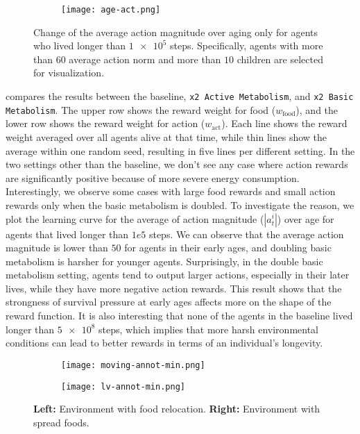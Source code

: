 \begin{figure}[t]
  \begin{subfigure}[t]{7cm}
    \centering
    \texttt{[image: age-act.png]}
  \end{subfigure}
  \caption{
    Change of the average action magnitude over aging only for agents who lived longer than $\num{1e5}$ steps.
    Specifically, agents with more than $60$ average action norm and more than $10$ children are selected for visualization.
  }\label{figure:actnorm-age}
\end{figure}

 compares the results between the baseline, \texttt{x2 Active Metabolism}, and \texttt{x2 Basic Metabolism}. The upper row shows the reward weight for food ($w_{\mathrm{food}}$), and the lower row shows the reward weight for action ($w_{\mathrm{act}}$). Each line shows the reward weight averaged over all agents alive at that time, while thin lines show the average within one random seed, resulting in five lines per different setting. In the two settings other than the baseline, we don't see any case where action rewards are significantly positive because of more severe energy consumption. Interestingly, we observe some cases with large food rewards and small action rewards only when the basic metabolism is doubled. To investigate the reason, we plot the learning curve for the average of action magnitude ($|a_{t}^{i}|$) over age for agents that lived longer than $1e5$ steps. We can observe that the average action magnitude is lower than $50$ for agents in their early ages, and doubling basic metabolism is harsher for younger agents. Surprisingly, in the double basic metabolism setting, agents tend to output larger actions, especially in their later lives, while they have more negative action rewards. This result shows that the strongness of survival pressure at early ages affects more on the shape of the reward function. It is also interesting that none of the agents in the baseline lived longer than $\num{5e8}$ steps, which implies that more harsh environmental conditions can lead to better rewards in terms of an individual's longevity.

\begin{figure}[t]
  \begin{subfigure}[t]{4cm}
    \centering
    \texttt{[image: moving-annot-min.png]}
  \end{subfigure}
  \begin{subfigure}[t]{4cm}
    \centering
    \texttt{[image: lv-annot-min.png]}
  \end{subfigure}
  \caption{
    \textbf{Left:} Environment with food relocation.
    \textbf{Right:} Environment with spread foods.
  }\label{figure:foodloc}
\end{figure}

